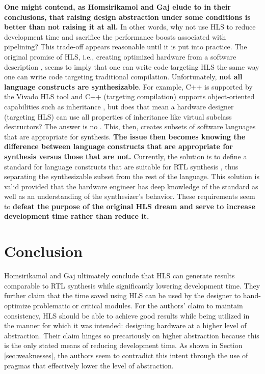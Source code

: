 \documentclass[12pt,journal,compsoc,onecolumn]{IEEEtran}
\begin{document}
\textbf{One might contend, as Homsirikamol and Gaj elude to in their conclusions, that raising design abstraction under some conditions is better than not raising it at all.} In other words, why not use HLS to reduce development time and sacrifice the performance boosts associated with pipelining? This trade-off appears reasonable until it is put into practice. The original promise of HLS, i.e., creating optimized hardware from a software description \cite{3}, seems to imply that one can write code targeting HLS the same way one can write code targeting traditional compilation. Unfortunately, \textbf{not all language constructs are synthesizable}. For example, C++ is supported by the Vivado HLS tool \cite{vivado} and C++ (targeting compilation) supports object-oriented capabilities such as inheritance \cite{c++datamodel}, but does that mean a hardware designer (targeting HLS) can use all properties of inheritance like virtual subclass destructors? The answer is no \cite{c++hls}. This, then, creates subsets of software languages that are appropriate for synthesis. \textbf{The issue then becomes knowing the difference between language constructs that are appropriate for synthesis versus those that are not.} Currently, the solution is to define a standard for language constructs that are suitable for RTL synthesis \cite{ieeeverilog}, thus separating the synthesizable subset from the rest of the language. This solution is valid provided that the hardware engineer has deep knowledge of the standard as well as an understanding of the synthesizer's behavior. These requirements seem to \textbf{defeat the purpose of the original HLS dream and serve to increase development time rather than reduce it.}

\section{Conclusion}
Homsirikamol and Gaj ultimately conclude that HLS can generate results comparable to RTL synthesis while significantly lowering development time. They further claim that the time saved using HLS can be used by the designer to hand-optimize problematic or critical modules. For the authors' claim to maintain consistency, HLS should be able to achieve good results while being utilized in the manner for which it was intended: designing hardware at a higher level of abstraction. Their claim hinges so precariously on higher abstraction because this is the only stated means of reducing development time. As shown in Section \ref{sec:weaknesses}, the authors seem to contradict this intent through the use of pragmas that effectively lower the level of abstraction.
\end{document}
